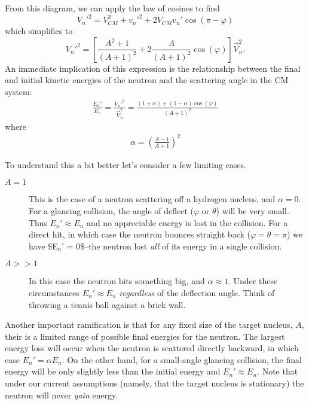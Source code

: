 \documentclass[11pt]{article}
\begin{document}
From this diagram, we can apply the law of cosines to find
\begin{equation}
  V_n'^2 = V_{CM}^2 + v_n'^2 + 2 V_{CM}v_n'\cos(\pi-\varphi)
\end{equation}
which simplifies to
\begin{equation}
  V_n'^2 = \left[ \frac{A^2+1}{(A+1)^2} + 2 \frac{A}{(A+1)^2}\cos(\varphi) \right] \vec{V}_n^2.
\end{equation}
An immediate implication of this expression is the relationship between the final and initial kinetic energies of the neutron and the scattering angle in the CM system:
\begin{align*}
  \frac{E_n'}{E_n} = \frac{V_n'^2}{\vec{V}_n^2}
                   = \frac{(1+\alpha) + (1-\alpha) \cos(\varphi)}{(A+1)^2}
\end{align*}
where
\begin{align*}
  \alpha = \left( \frac{A-1}{A+1} \right)^2
\end{align*}

To understand this a bit better let's consider a few limiting cases.
\begin{description}
\item[{\(A=1\)}] This is the case of a neutron scattering off a hydrogen nucleus, and \(\alpha = 0\).  For a glancing collision, the angle of deflect (\(\varphi\) or \(\theta\)) will be very small.  Thus \(E_n' \approx E_n\) and no appreciable energy is lost in the collision.  For a direct hit, in which case the neutron bounces straight back (\(\varphi = \theta = \pi\)) we have \$E\(_{\text{n}}\)' = 0\$--the neutron lost \emph{all} of its energy in a single collision.
\item[{\(A>>1\)}] In this case the neutron hits something big, and \(\alpha \approx 1\).  Under these circumstances \(E_n' \approx E_n\) \emph{regardless} of the deflection angle.  Think of throwing a tennis ball against a brick wall.
\end{description}

Another important ramification is that for any fixed size of the target nucleus, \(A\), their is a limited range of possible final energies for the neutron.  The largest energy loss will occur when the neutron is scattered directly backward, in which case \(E_n' = \alpha E_n\).  On the other hand, for a small-angle glancing collision, the final energy will be only slightly less than the initial energy and \(E_n' \approx E_n\).  Note that under our current assumptions (namely, that the target nucleus is stationary) the neutron will never \emph{gain} energy.
\end{document}
